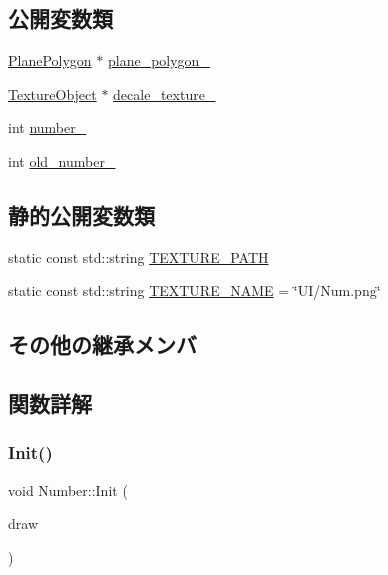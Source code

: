 \subsection*{公開変数類}
\begin{DoxyCompactItemize}
\item 
\mbox{\hyperlink{class_plane_polygon}{Plane\+Polygon}} $\ast$ \mbox{\hyperlink{class_number_a588084d69c46b02ddb608448724cfe11}{plane\+\_\+polygon\+\_\+}}
\item 
\mbox{\hyperlink{class_texture_object}{Texture\+Object}} $\ast$ \mbox{\hyperlink{class_number_a305385aaec293089117c50fd1cf2575f}{decale\+\_\+texture\+\_\+}}
\item 
int \mbox{\hyperlink{class_number_a8c3235a3442303d4ef950fef5eb7b34c}{number\+\_\+}}
\item 
int \mbox{\hyperlink{class_number_acd5422010e99cbf61196094a9b501115}{old\+\_\+number\+\_\+}}
\end{DoxyCompactItemize}
\subsection*{静的公開変数類}
\begin{DoxyCompactItemize}
\item 
static const std\+::string \mbox{\hyperlink{class_number_a0018ed63d70f4dde3c64bf99df7978ce}{T\+E\+X\+T\+U\+R\+E\+\_\+\+P\+A\+TH}}
\item 
static const std\+::string \mbox{\hyperlink{class_number_a43c6583cef6d8d32b8de6683f80bdb59}{T\+E\+X\+T\+U\+R\+E\+\_\+\+N\+A\+ME}} = \char`\"{}UI/Num.\+png\char`\"{}
\end{DoxyCompactItemize}
\subsection*{その他の継承メンバ}


\subsection{関数詳解}
\mbox{\label{class_number_ad92c9038810d0f831fdb9b5b13901b79}} 
\subsubsection{\texorpdfstring{Init()}{Init()}}
{\footnotesize\ttfamily void Number\+::\+Init (\begin{DoxyParamCaption}\item[{\mbox{\hyperlink{class_draw_base}{Draw\+Base}} $\ast$}]{draw }\end{DoxyParamCaption})}


